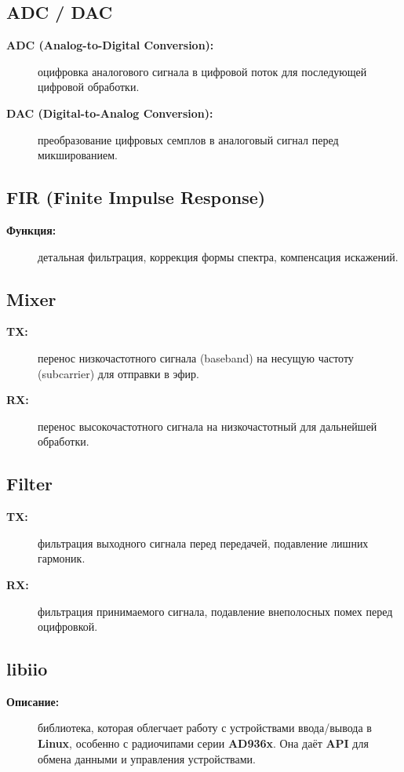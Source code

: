 \subsection*{\textbf{ADC / DAC}}
\begin{description}
  \item[\textbf{ADC (Analog-to-Digital Conversion):}] оцифровка аналогового сигнала в цифровой поток для последующей цифровой обработки.
  \item[\textbf{DAC (Digital-to-Analog Conversion):}] преобразование цифровых семплов в аналоговый сигнал перед микшированием.
\end{description}

\subsection*{\textbf{FIR (Finite Impulse Response)}}
\begin{description}
  \item[\textbf{Функция:}] детальная фильтрация, коррекция формы спектра, компенсация искажений.
\end{description}

\subsection*{\textbf{Mixer}}
\begin{description}
  \item[\textbf{TX:}] перенос низкочастотного сигнала (baseband) на несущую частоту (subcarrier) для отправки в эфир.
  \item[\textbf{RX:}] перенос высокочастотного сигнала на низкочастотный для дальнейшей обработки.
\end{description}

\subsection*{\textbf{Filter}}
\begin{description}
  \item[\textbf{TX:}] фильтрация выходного сигнала перед передачей, подавление лишних гармоник.
  \item[\textbf{RX:}] фильтрация принимаемого сигнала, подавление внеполосных помех перед оцифровкой.
\end{description}

\subsection*{\textbf{libiio}}
\begin{description}
  \item[\textbf{Описание:}] библиотека, которая облегчает работу с устройствами ввода/вывода в \textbf{Linux}, особенно с радиочипами серии \textbf{AD936x}. 
  Она даёт \textbf{API} для обмена данными и управления устройствами.
\end{description}

